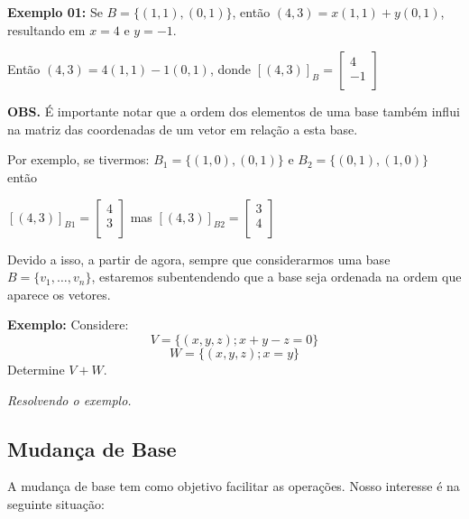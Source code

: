 \documentclass[oneside,a4paper,12pt]{article}
\begin{document}
{\bf Exemplo 01:} Se $B = \{ (1,1), (0,1) \}$, então $(4,3) = x(1,1) + y(0,1)$, resultando em $x = 4$ e $y = -1$.

Então $(4,3) = 4(1,1) -1(0,1)$, donde $[(4,3)]_B = \left[
\begin{array}{c}
4	\\
-1 \\
\end{array}
\right]$

{\bf OBS. } É importante notar que a ordem dos elementos de uma base também influi na matriz das coordenadas de um vetor em relação a esta base.

Por exemplo, se tivermos: $B_1 = \{ (1,0), (0,1) \}$ e $B_2 = \{ (0,1), (1,0) \}$ então

$[(4,3)]_{B1} = \left[
\begin{array}{c}
4	\\
3 \\
\end{array}
\right]$ mas 
$[(4,3)]_{B2} = \left[
\begin{array}{c}
3	\\
4 \\
\end{array}
\right]$

Devido a isso, a partir de agora, sempre que considerarmos uma base $B = \{ v_1, \dots, v_n \}$, estaremos subentendendo que a base seja ordenada na ordem que aparece os vetores.

{\bf Exemplo:} Considere:
$$V = \{ (x,y,z); x + y - z = 0 \}$$
$$W = \{ (x,y,z); x = y \}$$
Determine $V + W$.

\vspace{50pt}
\emph{Resolvendo o exemplo.}

\subsection{Mudança de Base}

A mudança de base tem como objetivo facilitar as operações.
Nosso interesse é na seguinte situação:
\end{document}
